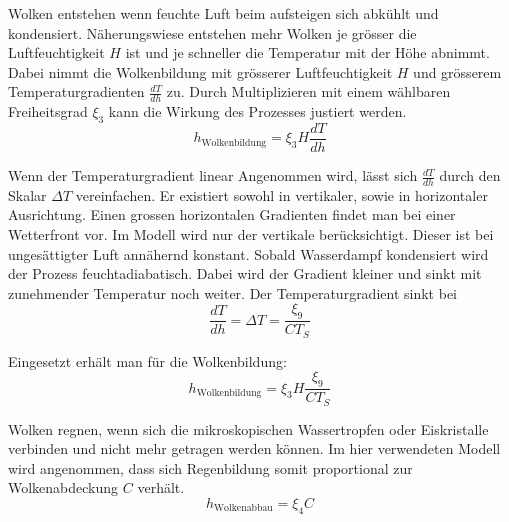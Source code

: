 \begin{refsection}

Wolken entstehen wenn feuchte Luft beim aufsteigen sich abkühlt und kondensiert. Näherungswiese entstehen mehr Wolken je grösser die Luftfeuchtigkeit $H$ ist und je schneller die Temperatur mit der Höhe abnimmt.
Dabei nimmt die Wolkenbildung mit grösserer Luftfeuchtigkeit $H$ und grösserem Temperaturgradienten $\frac{dT}{dh}$ zu. Durch Multiplizieren mit einem wählbaren Freiheitsgrad $\xi_3$ kann die Wirkung des Prozesses justiert werden. 
\begin{equation}
h_{\text{Wolkenbildung}} = \xi_3 H \frac{dT}{dh}
\end{equation}

Wenn der Temperaturgradient linear Angenommen wird, lässt sich $\frac{dT}{dh}$ durch den Skalar $\Delta T $ vereinfachen.
Er existiert sowohl in vertikaler, sowie in horizontaler Ausrichtung. Einen grossen horizontalen Gradienten findet man bei einer Wetterfront vor. Im Modell wird nur der vertikale berücksichtigt. Dieser ist bei ungesättigter Luft annähernd konstant. Sobald Wasserdampf kondensiert wird der Prozess feuchtadiabatisch. Dabei wird der Gradient kleiner und sinkt mit zunehmender Temperatur noch weiter.
Der Temperaturgradient sinkt bei 
\begin{equation}
\frac{dT}{dh} = \Delta T = \frac{\xi_9}{C T_S} 
\end{equation}

Eingesetzt erhält man für die Wolkenbildung:
\begin{equation}
h_{\text{Wolkenbildung}} = \xi_3 H \frac{\xi_9}{C T_S}
\end{equation}

Wolken regnen, wenn sich die mikroskopischen Wassertropfen oder Eiskristalle verbinden und nicht mehr getragen werden können. Im hier verwendeten Modell wird angenommen, dass sich Regenbildung somit proportional zur Wolkenabdeckung $C$ verhält.
\begin{equation}
h_{\text{Wolkenabbau}} = \xi_4 C
\end{equation}


\end{refsection}

